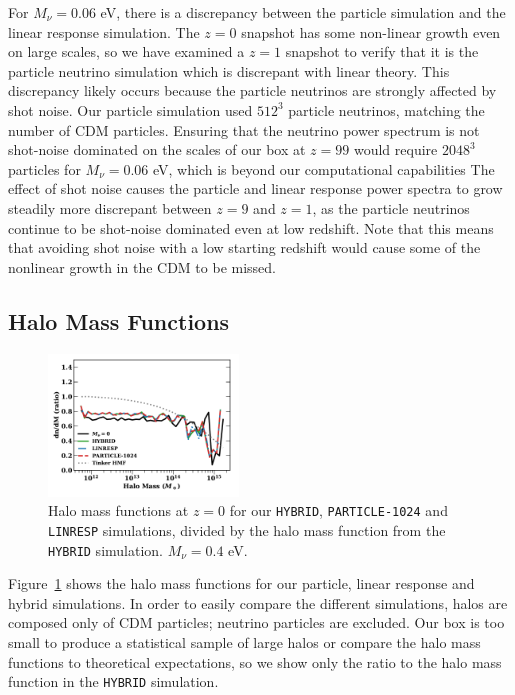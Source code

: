 \documentclass[useAMS, usenatbib]{mnras}
\begin{document}
For $M_\nu = 0.06$ eV, there is a discrepancy between the particle simulation and the linear response simulation. The $z=0$ snapshot has some non-linear growth even on large scales, so we have examined a $z=1$ snapshot to verify that it is the particle neutrino simulation which is discrepant with linear theory. This discrepancy likely occurs because the particle neutrinos are strongly affected by shot noise. Our particle simulation used $512^3$ particle neutrinos, matching the number of CDM particles. Ensuring that the neutrino power spectrum is not shot-noise dominated on the scales of our box at $z=99$ would require $2048^3$ particles for $M_\nu = 0.06$ eV, which is beyond our computational capabilities The effect of shot noise causes the particle and linear response power spectra to grow steadily more discrepant between $z=9$ and $z=1$, as the particle neutrinos continue to be shot-noise dominated even at low redshift. Note that this means that avoiding shot noise with a low starting redshift would cause some of the nonlinear growth in the CDM to be missed.

\subsection{Halo Mass Functions}
\label{sec:halomass}

\begin{figure}
  \includegraphics[width=0.45\textwidth]{nuplots/hmf-1.pdf}
\caption{Halo mass functions at $z=0$ for our \texttt{HYBRID}, \texttt{PARTICLE-1024} and \texttt{LINRESP} simulations, divided by the halo mass function from the \texttt{HYBRID} simulation. $M_\nu = 0.4$ eV.}
  \label{fig:halomass}
\end{figure}

Figure~\ref{fig:halomass} shows the halo mass functions for our particle, linear response and hybrid simulations. In order to easily compare the different simulations, halos are composed only of CDM particles; neutrino particles are excluded. Our box is too small to produce a statistical sample of large halos or compare the halo mass functions to theoretical expectations, so we show only the ratio to the halo mass function in the \texttt{HYBRID} simulation.
\end{document}
